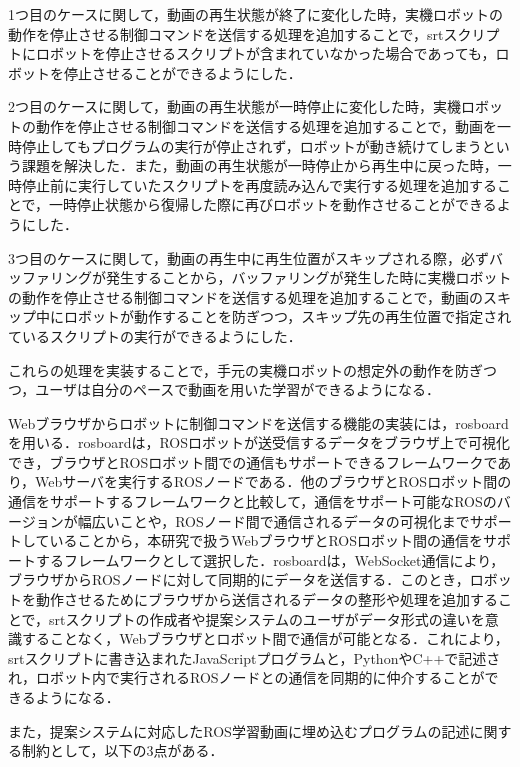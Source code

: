 \documentclass{ujarticle}
\begin{document}
\par 1つ目のケースに関して，動画の再生状態が終了に変化した時，実機ロボットの動作を停止させる制御コマンドを送信する処理を追加することで，srtスクリプトにロボットを停止させるスクリプトが含まれていなかった場合であっても，ロボットを停止させることができるようにした．
\par 2つ目のケースに関して，動画の再生状態が一時停止に変化した時，実機ロボットの動作を停止させる制御コマンドを送信する処理を追加することで，動画を一時停止してもプログラムの実行が停止されず，ロボットが動き続けてしまうという課題を解決した．また，動画の再生状態が一時停止から再生中に戻った時，一時停止前に実行していたスクリプトを再度読み込んで実行する処理を追加することで，一時停止状態から復帰した際に再びロボットを動作させることができるようにした．
\par 3つ目のケースに関して，動画の再生中に再生位置がスキップされる際，必ずバッファリングが発生することから，バッファリングが発生した時に実機ロボットの動作を停止させる制御コマンドを送信する処理を追加することで，動画のスキップ中にロボットが動作することを防ぎつつ，スキップ先の再生位置で指定されているスクリプトの実行ができるようにした．
\par これらの処理を実装することで，手元の実機ロボットの想定外の動作を防ぎつつ，ユーザは自分のペースで動画を用いた学習ができるようになる．


\par Webブラウザからロボットに制御コマンドを送信する機能の実装には，rosboard\cite{rosboard}を用いる．rosboardは，ROSロボットが送受信するデータをブラウザ上で可視化でき，ブラウザとROSロボット間での通信もサポートできるフレームワークであり，Webサーバを実行するROSノードである．他のブラウザとROSロボット間の通信をサポートするフレームワークと比較して，通信をサポート可能なROSのバージョンが幅広いことや，ROSノード間で通信されるデータの可視化までサポートしていることから，本研究で扱うWebブラウザとROSロボット間の通信をサポートするフレームワークとして選択した．rosboardは，WebSocket通信により，ブラウザからROSノードに対して同期的にデータを送信する．このとき，ロボットを動作させるためにブラウザから送信されるデータの整形や処理を追加することで，srtスクリプトの作成者や提案システムのユーザがデータ形式の違いを意識することなく，Webブラウザとロボット間で通信が可能となる．これにより，srtスクリプトに書き込まれたJavaScriptプログラムと，PythonやC++で記述され，ロボット内で実行されるROSノードとの通信を同期的に仲介することができるようになる．

\par また，提案システムに対応したROS学習動画に埋め込むプログラムの記述に関する制約として，以下の3点がある．
\end{document}
